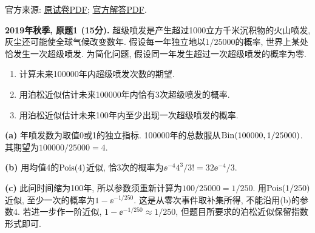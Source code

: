 \noindent 官方来源: \href{https://ocw.mit.edu/courses/18-600-probability-and-random-variables-fall-2019/dea9112a7fe28281e2c236ab6334f7ad_MIT18_600F19_midterm1.pdf}{原试卷PDF}; \href{https://ocw.mit.edu/courses/18-600-probability-and-random-variables-fall-2019/62e1b919e9f7bf208a943bde0d0dc607_MIT18_600F19_midterm1_soln.pdf}{官方解答PDF}.
\begin{exercise}\label{ex:m1-2019f-q1}
\textbf{2019年秋季, 原题1 (15分).} 超级喷发是产生超过1000立方千米沉积物的火山喷发, 灰尘还可能使全球气候改变数年. 假设每一年独立地以$1/25000$的概率, 世界上某处恰发生一次超级喷发. 为简化问题, 假设同一年发生超过一次超级喷发的概率为零.
\begin{enumerate}\item[(a)]\label{ex:m1-2019f-q1-a} 计算未来100000年内超级喷发次数的期望.\item[(b)]\label{ex:m1-2019f-q1-b} 用泊松近似估计未来100000年内恰有3次超级喷发的概率.\item[(c)]\label{ex:m1-2019f-q1-c} 用泊松近似估计未来100年内至少出现一次超级喷发的概率.\end{enumerate}
\end{exercise}
\begin{solution}
\textbf{(a)}\label{sol:m1-2019f-q1-a} 年喷发数为取值0或1的独立指标. 100000年的总数服从$\operatorname{Bin}(100000,1/25000)$. 其期望为$100000/25000=4$.

\textbf{(b)}\label{sol:m1-2019f-q1-b} 用均值4的$\operatorname{Pois}(4)$近似, 恰3次的概率为$\ee^{-4}4^3/3!=32\ee^{-4}/3$.

\textbf{(c)}\label{sol:m1-2019f-q1-c} 此问时间缩为100年, 所以参数须重新计算为$100/25000=1/250$. 用$\operatorname{Pois}(1/250)$近似, 至少一次的概率为$1-\ee^{-1/250}$. 这是从零次事件取补集所得, 不能沿用(b)的参数4. 若进一步作一阶近似, $1-\ee^{-1/250}\approx1/250$, 但题目所要求的泊松近似保留指数形式即可.
\end{solution}

